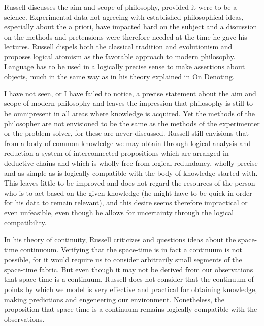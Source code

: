 \documentclass{article}
\date{September 16, 2014}
\begin{document}
\maketitle

Russell discusses the aim and scope of philosophy, provided it were to be a science. Experimental data not agreeing with established philosophical ideas, especially about the a priori, have impacted hard on the subject and a discussion on the methods and pretensions were therefore needed at the time he gave his lectures. Russell dispels both the classical tradition and evolutionism and proposes logical atomism as the favorable approach to modern philosophy. Language has to be used in a logically precise sense to make assertions about objects, much in the same way as in his theory explained in On Denoting. 

I have not seen, or I have failed to notice, a precise statement about the aim and scope of modern philosophy and leaves the impression that philosophy is still to be omnipresent in all areas where knowledge is acquired. Yet the methods of the philosopher are not envisioned to be the same as the methods of the experimenter or the problem solver, for these are never discussed. Russell still envisions that from a body of common knowledge we may obtain through logical analysis and reduction a system of interconnected propositions which are arranged in deductive chains and which is wholly free from logical redundancy, wholly precise and as simple as is logically compatible with the body of knowledge started with. This leaves little to be improved and does not regard the resources of the person who is to act based on the given knowledge (he might have to be quick in order for his data to remain relevant), and this desire seems therefore impractical or even unfeasible, even though he allows for uncertainty through the logical compatibility. 

In his theory of continuity, Russell criticizes and questions ideas about the space-time continuoum. Verifying that the space-time is in fact a continuum is not possible, for it would require us to consider arbitrarily small segments of the space-time fabric. But even though it may not be derived from our observations that space-time is a continuum, Russell does not consider that the continuum of points by which we model is very effective and practical for obtaining knowledge, making predictions and engeneering our environment. Nonetheless, the proposition that space-time is a continuum remains logically compatible with the observations. 
\end{document}
